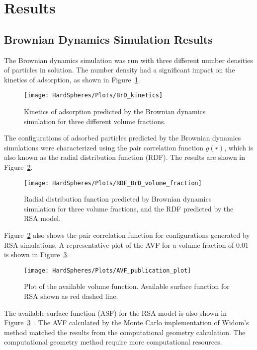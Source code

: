 \section*{Results}


\subsection{Brownian Dynamics Simulation Results}

The Brownian dynamics simulation was run with three different number
densities of particles in solution. The number density had a significant
impact on the kinetics of adsorption, as shown in Figure~\ref{fig:BrD Adsorption Kinetics}.%
\begin{figure}
\texttt{[image: HardSpheres/Plots/BrD\_kinetics]}\caption{\label{fig:BrD Adsorption Kinetics}Kinetics of adsorption predicted
by the Brownian dynamics simulation for three different volume fractions.}


%
\end{figure}
 The configurations of adsorbed particles predicted by the Brownian
dynamics simulations were characterized using the pair correlation
function $g\left(r\right)$, which is also known as the radial distribution
function (RDF). The results are shown in Figure~\ref{fig:Brownian Dynamics RDF}.
%
\begin{figure}
\texttt{[image: HardSpheres/Plots/RDF\_BrD\_volume\_fraction]}\caption{\label{fig:Brownian Dynamics RDF}Radial distribution function predicted
by Brownian dynamics simulation for three volume fractions, and the
RDF predicted by the RSA model.}
%
\end{figure}
 Figure~\ref{fig:Brownian Dynamics RDF} also shows the pair correlation
function for configurations generated by RSA simulations. A representative
plot of the AVF for a volume fraction of 0.01 is shown in Figure~\ref{fig:Available Volume Function}.%
\begin{figure}[H]
\texttt{[image: HardSpheres/Plots/AVF\_publication\_plot]}

\caption{\label{fig:Available Volume Function}Plot of the available volume
function. Available surface function for RSA shown as red dashed line.}
%
\end{figure}
 The available surface function (ASF) for the RSA model is also shown
in Figure~\ref{fig:Available Volume Function}~\cite{Schaaf1989}.
The AVF calculated by the Monte Carlo implementation of Widom's method
matched the results from the computational geometry calculation. The
computational geometry method require more computational resources.


